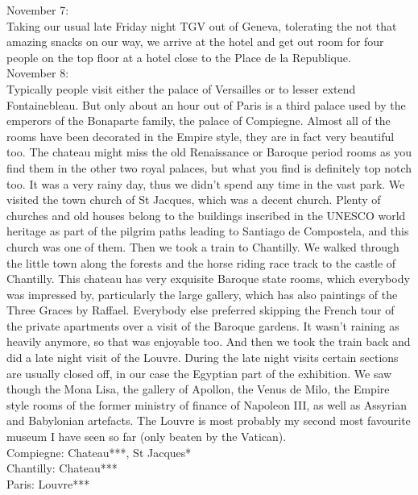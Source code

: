November 7:\\
Taking our usual late Friday night TGV out of Geneva, tolerating the not that amazing snacks on our way, we arrive at the hotel and get out room for four people on the top floor at a hotel close to the Place de la Republique.\\

November 8:\\
Typically people visit either the palace of Versailles or to lesser extend Fontainebleau. But only about an hour out of Paris is a third palace used by the emperors of the Bonaparte family, the palace of Compiegne. Almost all of the rooms have been decorated in the Empire style, they are in fact very beautiful too. The chateau might miss the old Renaissance or Baroque period rooms as you find them in the other two royal palaces, but what you find is definitely top notch too. It was a very rainy day, thus we didn't spend any time in the vast park. We visited the town church of St Jacques, which was a decent church. Plenty of churches and old houses belong to the buildings inscribed in the UNESCO world heritage as part of the pilgrim paths leading to Santiago de Compostela, and this church was one of them. Then we took a train to Chantilly. We walked through the little town along the forests and the horse riding race track to the castle of Chantilly. This chateau has very exquisite Baroque state rooms, which everybody was impressed by, particularly the large gallery, which has also paintings of the Three Graces by Raffael. Everybody else preferred skipping the French tour of the private apartments over a visit of the Baroque gardens. It wasn't raining as heavily anymore, so that was enjoyable too. And then we took the train back and did a late night visit of the Louvre. During the late night visits certain sections are usually closed off, in our case the Egyptian part of the exhibition. We saw though the Mona Lisa, the gallery of Apollon, the Venus de Milo, the Empire style rooms of the former ministry of finance of Napoleon III, as well as Assyrian and Babylonian artefacts. The Louvre is most probably my second most favourite museum I have seen so far (only beaten by the Vatican). \\

Compiegne: Chateau***, St Jacques*\\
Chantilly: Chateau***\\
Paris: Louvre***\\

